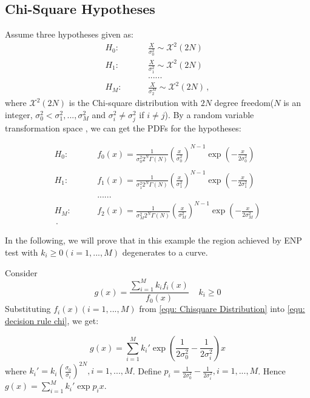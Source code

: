 \documentclass[12pt,journal,a4paper,twoside,onecolumn]{IEEEtran}
\begin{document}
\begin{spacing}{2.5}
\subsection{Chi-Square Hypotheses}
Assume three hypotheses  given as:
\begin{equation}
  \label{equ: Chisquare Hypothesis}
  \begin{split}
    H_0:\;\;\;\;\;\;\;\;&\frac{X}{\sigma_0^2} \sim \mathcal{X}^2(2N)\\
    H_1:\;\;\;\;\;\;\;\;&\frac{X}{\sigma_1^2} \sim \mathcal{X}^2(2N)\\
    &......\\
    H_M:\;\;\;\;\;\;\;\;&\frac{X}{\sigma_2^M} \sim \mathcal{X}^2(2N)\,,
  \end{split}
\end{equation}
where $\mathcal{X}^2(2N)$ is the Chi-square distribution with  $2N$ degree freedom($N$ is an integer, $\sigma_0^2 < \sigma_1^2, ..., \sigma_M^2$ and $\sigma_i^2 \neq \sigma_j^2$ if $i \neq j$). By a random variable transformation space \cite{mark2011probability}, we can get the PDFs for the hypotheses:

\def \CHISQU[#1]{\frac{1}{#1 2^N\Gamma(N)}\left(\frac{x}{#1}\right)^{N-1}\exp\left(-\frac{x}{2#1}\right)\\}
\begin{equation}
  \label{equ: Chisquare Distribution}
  \begin{split}
    H_0:\;\;\;\;\;\;\;\;&f_0(x) = \CHISQU[\sigma_0^2]\\
    H_1:\;\;\;\;\;\;\;\;&f_1(x) = \CHISQU[\sigma_1^2]\\
    &......\\
    H_M:\;\;\;\;\;\;\;\;&f_2(x) = \CHISQU[\sigma_M^2]\,.
  \end{split}
\end{equation}

In the following, we will prove that in this example the region achieved by ENP test with $k_i \geq 0 (i = 1, ..., M)$ degenerates to a curve.

Consider
\begin{equation}
\label{equ: decision rule chi}
  g(x) = \frac{\sum_{i=1}^{M}k_if_i(x)}{f_0(x)} \;\;\;\;k_i \geq 0
\end{equation}
Substituting $f_i(x) (i=1, ..., M)$ from \eqref{equ: Chisquare Distribution} into \eqref{equ: decision rule chi}, we get:

\begin{equation}
  \label{equ: decision rule chi 1}
g(x) = \sum_{i=1}^{M}k_i'\exp{(\frac{1}{2\sigma_0^2} - \frac{1}{2\sigma_i^2})x} 
\end{equation}
where $k_i' = k_i(\frac{\sigma_0}{\sigma_i})^{2N}, i= 1, ..., M$. Define $p_i = \frac{1}{2\sigma_0^2} - \frac{1}{2\sigma_i^2}, i=1, ..., M$. Hence $g(x) =  \sum_{i=1}^{M}k_i'\exp{p_ix}$.


\end{spacing}
\end{document}
